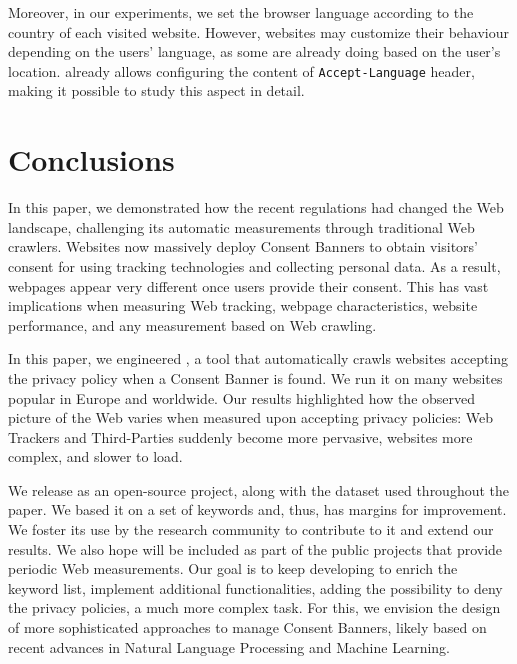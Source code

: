 Moreover, in our experiments, we set the browser language according to the country of each visited website. However, websites may customize their behaviour depending on the users' language, as some are already doing based on the user's location. \TOOL already allows configuring the content of \texttt{Accept-Language} header, making it possible to study this aspect in detail.

\section{Conclusions}
\label{sec:conclu}

In this paper, we demonstrated how the recent regulations had changed the Web landscape, challenging its automatic measurements through traditional Web crawlers. Websites now massively deploy Consent Banners to obtain visitors' consent for using tracking technologies and collecting personal data. As a result, webpages appear very different once users provide their consent. This has vast implications when measuring Web tracking, webpage characteristics, website performance, and any measurement based on Web crawling.

In this paper, we engineered \TOOL, a tool that automatically crawls websites accepting the privacy policy when a Consent Banner is found. We run it on many websites popular in Europe and worldwide. Our results highlighted how the observed picture of the Web varies when measured upon accepting privacy policies: Web Trackers and Third-Parties suddenly become more pervasive, websites more complex, and slower to load.

We release \TOOL as an open-source project, along with the dataset used throughout the paper. We based it on a set of keywords and, thus, has margins for improvement. We foster its use by the research community to contribute to it and extend our results. We also hope \TOOL will be included as part of the public projects that provide periodic Web measurements. Our goal is to keep developing \TOOL to enrich the keyword list, implement additional functionalities, adding the possibility to deny the privacy policies, a much more complex task. For this, we envision the design of more sophisticated approaches to manage Consent Banners, likely based on recent advances in Natural Language Processing and Machine Learning.
